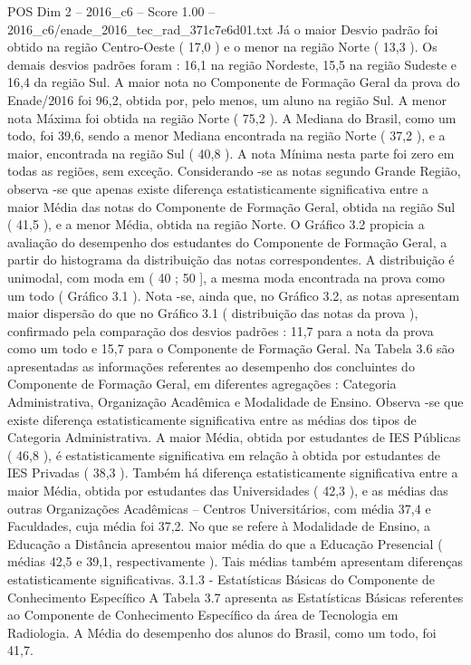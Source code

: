 \begin{textsample}{POS Dim 2 – 2016\_c6 – Score 1.00 – 2016\_c6/enade\_2016\_tec\_rad\_371c7e6d01.txt}
Já o maior Desvio padrão foi obtido na região Centro-Oeste ( 17,0 ) e o menor na região Norte ( 13,3 ).
Os demais desvios padrões foram : 16,1 na região Nordeste, 15,5 na região Sudeste e 16,4 da região Sul.
A maior nota no Componente de Formação Geral da prova do Enade/2016 foi 96,2, obtida por, pelo menos, um aluno na região Sul.
A menor nota Máxima foi obtida na região Norte ( 75,2 ).
A Mediana do Brasil, como um todo, foi 39,6, sendo a menor Mediana encontrada na região Norte ( 37,2 ), e a maior, encontrada na região Sul ( 40,8 ).
A nota Mínima nesta parte foi zero em todas as regiões, sem exceção.
Considerando -se as notas segundo Grande Região, observa -se que apenas existe diferença estatisticamente significativa entre a maior Média das notas do Componente de Formação Geral, obtida na região Sul ( 41,5 ), e a menor Média, obtida na região Norte.
O Gráfico 3.2 propicia a avaliação do desempenho dos estudantes do Componente de Formação Geral, a partir do histograma da distribuição das notas correspondentes.
A distribuição é unimodal, com moda em ( 40 ; 50 ], a mesma moda encontrada na prova como um todo ( Gráfico 3.1 ).
Nota -se, ainda que, no Gráfico 3.2, as notas apresentam maior dispersão do que no Gráfico 3.1 ( distribuição das notas da prova ), confirmado pela comparação dos desvios padrões : 11,7 para a nota da prova como um todo e 15,7 para o Componente de Formação Geral.
Na Tabela 3.6 são apresentadas as informações referentes ao desempenho dos concluintes do Componente de Formação Geral, em diferentes agregações : Categoria Administrativa, Organização Acadêmica e Modalidade de Ensino.
Observa -se que existe diferença estatisticamente significativa entre as médias dos tipos de Categoria Administrativa.
A maior Média, obtida por estudantes de IES Públicas ( 46,8 ), é estatisticamente significativa em relação à obtida por estudantes de IES Privadas ( 38,3 ).
Também há diferença estatisticamente significativa entre a maior Média, obtida por estudantes das Universidades ( 42,3 ), e as médias das outras Organizações Acadêmicas – Centros Universitários, com média 37,4 e Faculdades, cuja média foi 37,2.
No que se refere à Modalidade de Ensino, a Educação a Distância apresentou maior média do que a Educação Presencial ( médias 42,5 e 39,1, respectivamente ).
Tais médias também apresentam diferenças estatisticamente significativas. 3.1.3 - Estatísticas Básicas do Componente de Conhecimento Específico A Tabela 3.7 apresenta as Estatísticas Básicas referentes ao Componente de Conhecimento Específico da área de Tecnologia em Radiologia.
A Média do desempenho dos alunos do Brasil, como um todo, foi 41,7.

\end{textsample}
